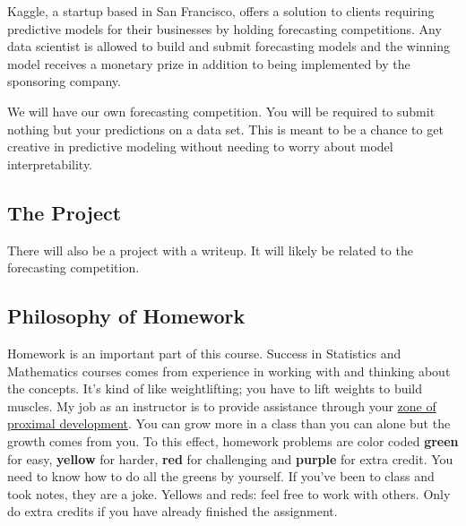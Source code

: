 \documentclass[12pt]{article}
\newcommand{\ingreen}[1]{\color{green}\textbf{#1} \color{black}}
\newcommand{\inyellow}[1]{\color{yellow}\textbf{#1} \color{black}}
\newcommand{\inred}[1]{\color{red}\textbf{#1} \color{black}}
\newcommand{\inpurple}[1]{\color{purple}\textbf{#1} \color{black}}
\begin{document}
Kaggle, a startup based in San Francisco, offers a solution to clients requiring predictive models for their businesses by holding forecasting competitions. Any data scientist is allowed to build and submit forecasting models and the winning model receives a monetary prize in addition to being implemented by the sponsoring company.  

We will have our own forecasting competition. You will be required to submit nothing but your predictions on a data set. This is meant to be a chance to get creative in predictive modeling without needing to worry about model interpretability. 


\subsection*{The Project}

There will also be a project with a writeup. It will likely be related to the forecasting competition.

\subsection*{Philosophy of Homework}

Homework is an important part of this course. Success in Statistics and Mathematics courses comes from experience in working with and thinking about the concepts. It's kind of like weightlifting; you have to lift weights to build muscles. My job as an instructor is to provide assistance through your \href{http://en.wikipedia.org/wiki/Zone_of_proximal_development}{zone of proximal development}. You can grow more in a class than you can alone but the growth comes from you. To this effect, homework problems are color coded \ingreen{green} for easy, \inyellow{yellow} for harder, \inred{red} for challenging and \inpurple{purple} for extra credit. You need to know how to do all the greens by yourself. If you've been to class and took notes, they are a joke. Yellows and reds: feel free to work with others. Only do extra credits if you have already finished the assignment.

%
\end{document}
